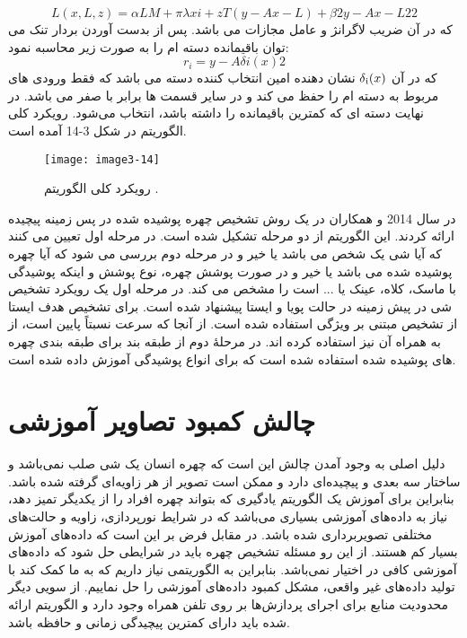 \begin{equation}\label{eq3-13}
L(x,L,z)=\alpha LM+πλxi+zT(y-Ax-L)+β2y-Ax-L22
\end{equation}
\noindent‏
که در آن  ضریب لاگرانژ و  عامل مجازات می باشد. پس از بدست آوردن بردار تنک  می توان باقیمانده دسته  ام را به صورت زیر محاسبه نمود:
\begin{equation}\label{eq3-14}
r_i=y-Aδi(x)2
\end{equation}‏
\noindent‏
که در آن
$\delta \textsubscript{i}(x)$
نشان دهنده  امین انتخاب کننده دسته می باشد که فقط ورودی های مربوط به دسته  ام را حفظ می کند و در سایر قسمت ها برابر با صفر می باشد. در نهایت دسته ای که کمترین باقیمانده را داشته باشد، انتخاب می‌شود. رویکرد کلی الگوریتم در شکل 3-14 آمده است.
 \begin{figure}[h]
\centering
  \texttt{[image: image3-14]}
  \caption{رویکرد کلی الگوریتم  \cite{ref1}.}
  \label{image2-1}
\end{figure}
\noindent
در سال 2014  و همکاران در \cite{7015448} یک روش تشخیص چهره پوشیده شده در پس زمینه پیچیده ارائه کردند. این الگوریتم از دو مرحله تشکیل شده است. در مرحله اول تعیین می کنند که آیا شی یک شخص می باشد یا خیر و در مرحله دوم بررسی می شود که آیا چهره پوشیده شده می باشد یا خیر و در صورت پوشش چهره، نوع پوشش و اینکه پوشیدگی با ماسک، کلاه، عینک یا ... است را مشخص می کند.
در مرحله اول یک رویکرد تشخیص شی در پیش زمینه در حالت پویا و ایستا پیشنهاد شده است. برای تشخیص هدف ایستا از تشخیص مبتنی بر ویژگی  استفاده شده است. از آنجا که سرعت  نسبتاً پایین است، از  به همراه آن نیز استفاده کرده اند. 
در مرحلۀ دوم از طبقه بند  برای طبقه بندی چهره های پوشیده شده استفاده شده است که برای انواع پوشیدگی آموزش داده شده است.
\section{چالش کمبود تصاویر آموزشی}
دلیل اصلی به وجود آمدن چالش‌ این است که چهره انسان یک شی صلب نمی‌باشد و ساختار سه بعدی و پیچیده‌ای دارد و ممکن است تصویر از هر زاویه‌ای گرفته شده باشد. بنابراین برای آموزش یک الگوریتم یادگیری که بتواند چهره افراد را از یکدیگر تمیز دهد، نیاز به داده‌های آموزشی بسیاری می‌باشد که در شرایط نورپردازی، زاویه و حالت‌های مختلفی تصویربرداری شده باشد. در مقابل فرض بر این است که داده‌های آموزش بسیار کم هستند. از این رو مسئله تشخیص چهره باید در شرایطی حل شود که داده‌های آموزشی کافی در اختیار نمی‌باشد. بنابراین به الگوریتمی نیاز داریم که به ما کمک کند با تولید داده‌های غیر واقعی، مشکل کمبود داده‌های آموزشی را حل نماییم. از سویی دیگر محدودیت‌ منابع برای اجرای پردازش‌ها بر روی تلفن همراه وجود دارد و الگوریتم ارائه شده باید دارای کمترین پیچیدگی زمانی و حافظه باشد.

